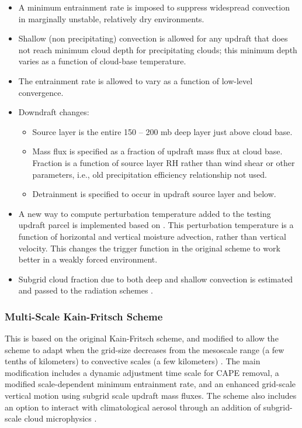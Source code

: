 \begin{itemize}\setlength{\parskip}{-4pt}
\item
 A minimum entrainment rate is imposed to suppress widespread convection 
in marginally unstable, relatively dry environments.

\item
Shallow (non precipitating) convection is allowed for any updraft 
that does not reach minimum cloud depth for precipitating clouds; 
this minimum depth varies as a function of cloud-base temperature.

\item
The entrainment rate is allowed to vary as a function of low-level convergence.

\item
Downdraft changes:

\begin{itemize}\setlength{\parskip}{-4pt}
\item
Source layer is the entire 150 -- 200 mb deep layer just above cloud base.

\item
Mass flux is specified as a fraction of updraft mass flux at cloud base.
Fraction is a function of source layer RH rather than wind shear 
or other parameters, i.e., old precipitation efficiency relationship not used.

\item
Detrainment is specified to occur in updraft source layer and below.
\end{itemize}

\item
A new way to compute perturbation temperature added to the testing updraft 
parcel is implemented based on \citet{ma2009}. This perturbation temperature
is a function of horizontal and vertical moisture advection, rather than vertical
velocity. This changes the trigger function in the original scheme to work better
in a weakly forced environment.

\item
Subgrid cloud fraction due to both deep and shallow convection is estimated and passed
to the radiation schemes \citep{alapaty12}.
\end{itemize}

\subsubsection{Multi-Scale Kain-Fritsch Scheme}

This is based on the original Kain-Fritsch scheme, and modified to allow 
the scheme to adapt when the grid-size decreases from the mesoscale range (a few tenths 
of kilometers) to convective scales (a few kilometers) \citep{zheng16}. The main modification includes 
a dynamic adjustment time scale for CAPE removal, a modified scale-dependent minimum 
entrainment rate, and an enhanced grid-scale vertical motion using subgrid scale updraft 
mass fluxes. The scheme also includes an option to interact with climatological 
aerosol through an addition of subgrid-scale cloud microphysics \citep{glotfelty19}.

